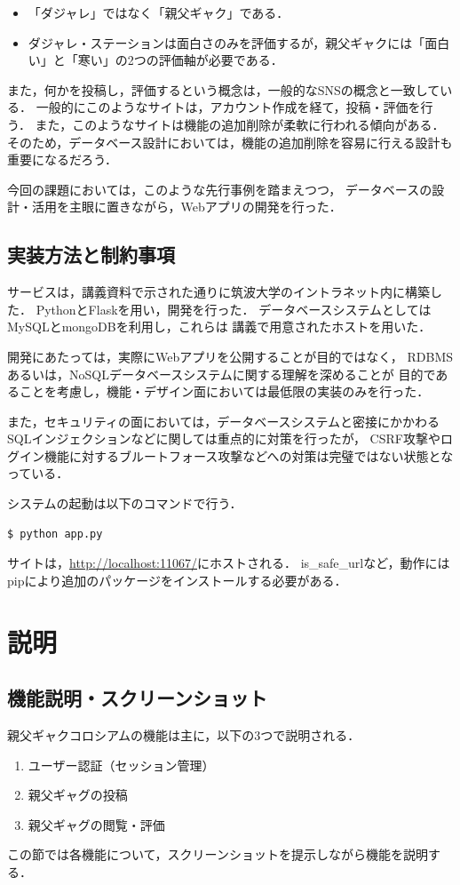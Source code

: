 \documentclass[a4paper,11pt]{jsreport}
\begin{document}
\begin{itemize}
  \item 「ダジャレ」ではなく「親父ギャク」である．
  \item ダジャレ・ステーションは面白さのみを評価するが，親父ギャクには「面白い」と「寒い」の2つの評価軸が必要である．
\end{itemize}

また，何かを投稿し，評価するという概念は，一般的なSNSの概念と一致している．
一般的にこのようなサイトは，アカウント作成を経て，投稿・評価を行う．
また，このようなサイトは機能の追加削除が柔軟に行われる傾向がある．
そのため，データベース設計においては，機能の追加削除を容易に行える設計も
重要になるだろう．

今回の課題においては，このような先行事例を踏まえつつ，
データベースの設計・活用を主眼に置きながら，Webアプリの開発を行った．

\section{実装方法と制約事項}
サービスは，講義資料で示された通りに筑波大学のイントラネット内に構築した．
PythonとFlaskを用い，開発を行った．
データベースシステムとしてはMySQLとmongoDBを利用し，これらは
講義で用意されたホストを用いた．

開発にあたっては，実際にWebアプリを公開することが目的ではなく，
RDBMSあるいは，NoSQLデータベースシステムに関する理解を深めることが
目的であることを考慮し，機能・デザイン面においては最低限の実装のみを行った．

また，セキュリティの面においては，データベースシステムと密接にかかわる
SQLインジェクションなどに関しては重点的に対策を行ったが，
CSRF攻撃やログイン機能に対するブルートフォース攻撃などへの対策は完璧ではない状態となっている．

システムの起動は以下のコマンドで行う．
\begin{lstlisting}
$ python app.py
\end{lstlisting}
サイトは，\url{http://localhost:11067/}にホストされる．
is\_safe\_urlなど，動作にはpipにより追加のパッケージをインストールする必要がある．

\chapter{説明}
\section{機能説明・スクリーンショット}
親父ギャクコロシアムの機能は主に，以下の3つで説明される．
\begin{enumerate}
  \item ユーザー認証（セッション管理）
  \item 親父ギャグの投稿
  \item 親父ギャグの閲覧・評価
\end{enumerate}
この節では各機能について，スクリーンショットを提示しながら機能を説明する．
\end{document}
